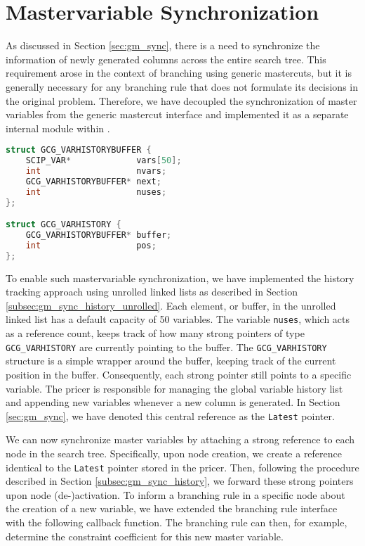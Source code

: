 \section{Mastervariable Synchronization}\label{sec:implementation_sync}
As discussed in Section \ref{sec:gm_sync}, there is a need to synchronize the information of newly generated columns across the entire search tree. This requirement arose in the context of branching using generic mastercuts, but it is generally necessary for any branching rule that does not formulate its decisions in the original problem. Therefore, we have decoupled the synchronization of master variables from the generic mastercut interface and implemented it as a separate internal module within \GCG{}.

\begin{lstlisting}[language=C, caption=Variable History Construct]
struct GCG_VARHISTORYBUFFER {
	SCIP_VAR*             vars[50];
	int                   nvars;
	GCG_VARHISTORYBUFFER* next;
	int                   nuses;
};

struct GCG_VARHISTORY {
	GCG_VARHISTORYBUFFER* buffer;
	int                   pos;
};
\end{lstlisting}

To enable such mastervariable synchronization, we have implemented the history tracking approach using unrolled linked lists as described in Section \ref{subsec:gm_sync_history_unrolled}. Each element, or buffer, in the unrolled linked list has a default capacity of 50 variables. The variable \texttt{nuses}, which acts as a reference count, keeps track of how many strong pointers of type \texttt{GCG\_VARHISTORY} are currently pointing to the buffer. The \texttt{GCG\_VARHISTORY} structure is a simple wrapper around the buffer, keeping track of the current position in the buffer. Consequently, each strong pointer still points to a specific variable. The \GCG{} pricer is responsible for managing the global variable history list and appending new variables whenever a new column is generated. In Section \ref{sec:gm_sync}, we have denoted this central reference as the \texttt{Latest} pointer.

We can now synchronize master variables by attaching a strong reference to each node in the search tree. Specifically, upon node creation, we create a reference identical to the \texttt{Latest} pointer stored in the \GCG{} pricer. Then, following the procedure described in Section \ref{subsec:gm_sync_history}, we forward these strong pointers upon node (de-)activation. To inform a branching rule in a specific node about the creation of a new variable, we have extended the \GCG{} branching rule interface with the following callback function. The branching rule can then, for example, determine the constraint coefficient for this new master variable.

